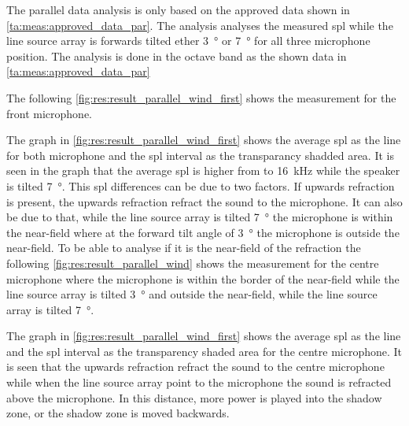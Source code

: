 The parallel data analysis is only based on the approved data shown in \autoref{ta:meas:approved_data_par}. The analysis analyses the measured \gls{spl} while the line source array is forwards tilted ether \SI{3}{\degree} or  \SI{7}{\degree} for all three microphone position. The analysis is done in the octave band as the shown data in \autoref{ta:meas:approved_data_par}

 The following \autoref{fig:res:result_parallel_wind_first}  shows the measurement for the front microphone.

  
The graph in \autoref{fig:res:result_parallel_wind_first} shows the average \gls{spl} as the line for both microphone and the \gls{spl} interval as the transparancy shadded area.
It is seen in the graph that the average \gls{spl} is higher from  to \SI{16}{\kilo\hertz} while the speaker is tilted \SI{7}{\degree}. This \gls{spl} differences can be due to two factors. If upwards refraction is present, the upwards refraction refract the sound to the microphone. It can also be due to that, while the line source array is tilted \SI{7}{\degree} the microphone is within the near-field where at the forward tilt angle of \SI{3}{\degree} the microphone is outside the near-field. To be able to analyse if it is the near-field of the refraction the following \autoref{fig:res:result_parallel_wind} shows the measurement for the centre microphone where the microphone is within the border of the near-field while the line source array is tilted \SI{3}{\degree} and outside the near-field, while the line source array is tilted \SI{7}{\degree}.
 
  
  
 
 
 The graph in \autoref{fig:res:result_parallel_wind_first} shows the average \gls{spl} as the line  and the \gls{spl} interval as the transparency shaded area for the centre microphone. It is seen that the upwards refraction refract the sound to the centre microphone while when the line source array point to the microphone the sound is refracted above the microphone. In this distance, more power is played into the shadow zone, or the shadow zone is moved backwards. 

